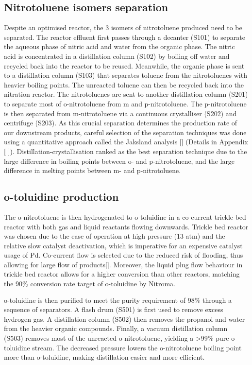 \subsection{Nitrotoluene isomers separation}
Despite an optimised reactor, the 3 isomers of nitrotoluene produced need to be separated. The reactor effluent first passes through a decanter (S101) to separate the aqueous phase of nitric acid and water from the organic phase. The nitric acid is concentrated in a distillation column (S102) by boiling off water and recycled back into the reactor to be reused. Meanwhile, the organic phase is sent to a distillation column (S103) that separates toluene from the nitrotoluenes with heavier boiling points. The unreacted toluene can then be recycled back into the nitration reactor. The nitrotoluenes are sent to another distillation column (S201) to separate most of o-nitrotoluene from m and p-nitrotoluene. The p-nitrotoluene is then separated from m-nitrotoluene via a continuous crystalliser (S202) and centrifuge (S203). As this crucial separation determines the production rate of our downstream products, careful selection of the separation techniques was done using a quantitative approach called the Jaksland analysis [] (Details in Appendix [ ]). Distillation-crystallisation ranked as the best separation technique due to the large difference in boiling points between o- and p-nitrotoluene, and the large difference in melting points between m- and p-nitrotoluene.

\subsection{o-toluidine production}
The o-nitrotoluene is then hydrogenated to o-toluidine in a co-current trickle bed reactor with both gas and liquid reactants flowing downwards. Trickle bed reactor was chosen due to the ease of operation at high pressure (13 atm) and the relative slow catalyst deactivation, which is imperative for an expensive catalyst usage of Pd. Co-current flow is selected due to the reduced risk of flooding, thus allowing for large flow of products[]. Moreover, the liquid plug flow behaviour in trickle bed reactor allows for a higher conversion than other reactors, matching the 90\% conversion rate target of o-toluidine by Nitroma. 

o-toluidine is then purified to meet the purity requirement of 98\% through a sequence of separators. A flash drum (S501) is first used to remove excess hydrogen gas. A distillation column (S502) then removes the propanol and water from the heavier organic compounds. Finally, a vacuum distillation column (S503) removes most of the unreacted o-nitrotoluene, yielding a >99\% pure o-toluidine stream. The decreased pressure lowers the o-nitrotoluene boiling point more than o-toluidine, making distillation easier and more efficient.  
 
